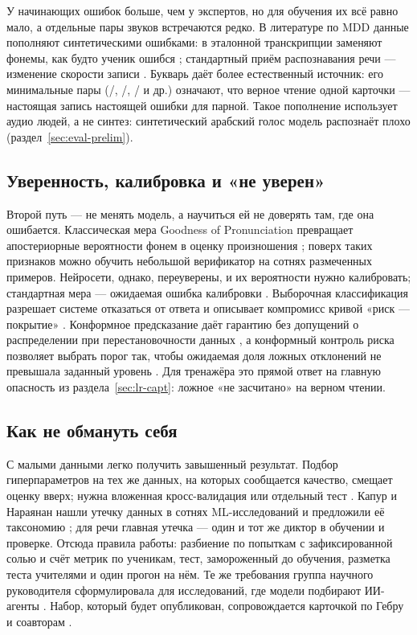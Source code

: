 У начинающих ошибок больше, чем у экспертов, но для обучения их всё равно мало, а отдельные пары звуков
встречаются редко. В литературе по MDD данные пополняют синтетическими ошибками: в эталонной
транскрипции заменяют фонемы, как будто ученик ошибся \cite{SRC-119}; стандартный приём распознавания
речи --- изменение скорости записи \cite{SRC-120}. Букварь даёт более естественный источник: его
минимальные пары (/, /, / и др.) означают, что верное чтение одной
карточки --- настоящая запись настоящей ошибки для парной. Такое пополнение использует аудио людей, а не
синтез: синтетический арабский голос модель распознаёт плохо (раздел~\ref{sec:eval-prelim}).

\subsection{Уверенность, калибровка и «не уверен»}

Второй путь --- не менять модель, а научиться ей не доверять там, где она ошибается. Классическая мера
Goodness of Pronunciation превращает апостериорные вероятности фонем в оценку произношения
\cite{SRC-115}; поверх таких признаков можно обучить небольшой верификатор на сотнях размеченных примеров.
Нейросети, однако, переуверены, и их вероятности нужно калибровать; стандартная мера --- ожидаемая ошибка
калибровки \cite{SRC-112}. Выборочная классификация разрешает системе отказаться от ответа и описывает
компромисс кривой «риск --- покрытие» \cite{SRC-117}. Конформное предсказание даёт гарантию без допущений
о распределении при перестановочности данных \cite{SRC-113}, а конформный контроль риска позволяет
выбрать порог так, чтобы ожидаемая доля ложных отклонений не превышала заданный уровень \cite{SRC-114}.
Для тренажёра это прямой ответ на главную опасность из раздела~\ref{sec:lr-capt}: ложное «не засчитано» на
верном чтении.

\subsection{Как не обмануть себя}

С малыми данными легко получить завышенный результат. Подбор гиперпараметров на тех же данных, на которых
сообщается качество, смещает оценку вверх; нужна вложенная кросс-валидация или отдельный тест
\cite{SRC-121}. Капур и Нараянан нашли утечку данных в сотнях ML-исследований и предложили её таксономию
\cite{SRC-122}; для речи главная утечка --- один и тот же диктор в обучении и проверке. Отсюда правила
работы: разбиение по попыткам с зафиксированной солью и счёт метрик по ученикам, тест, замороженный до обучения, разметка теста учителями и один прогон на нём.
Те же требования группа научного руководителя сформулировала для исследований, где модели подбирают
ИИ-агенты \cite{SRC-067}. Набор, который будет опубликован, сопровождается карточкой по Гебру и
соавторам \cite{SRC-123}.

